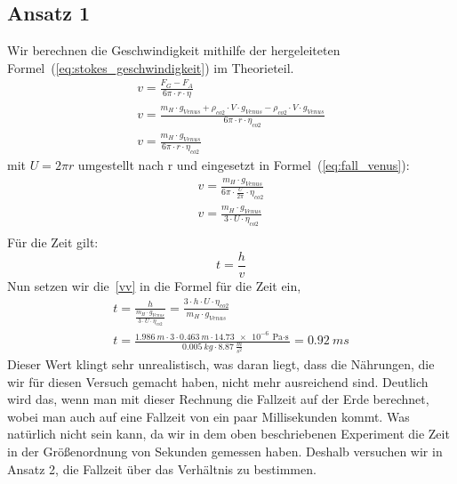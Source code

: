 \documentclass{article}
\begin{document}
      \subsection{Ansatz 1}
          Wir berechnen die Geschwindigkeit mithilfe der hergeleiteten Formel~(\ref{eq:stokes_geschwindigkeit}) im Theorieteil.
          \begin{equation}\label{eq:fall_venus}
              \begin{gathered}
                  v = \frac{ F_G - F_A }{ 6 \pi \cdot r \cdot \eta } \\
                  v= \frac{m_H \cdot g_{Venus}+\rho_{co2}\cdot V \cdot g_{Venus} - \rho_{co2}\cdot V \cdot g_{Venus}}{6 \pi \cdot r \cdot \eta_{co2}} \\
                  v= \frac{m_H \cdot g_{Venus}}{6 \pi \cdot r \cdot \eta_{co2}}
              \end{gathered}
          \end{equation}
          mit \( U = 2 \pi r \) umgestellt nach r und eingesetzt in Formel~(\ref{eq:fall_venus}):
          \begin{equation} \label{vv}
              \begin{gathered}
                  v = \frac{m_H \cdot g_{Venus}}{6 \pi \cdot \frac{U}{2\pi} \cdot \eta_{co2}} \\
                  v = \frac{m_H \cdot g_{Venus}}{3 \cdot U \cdot \eta_{co2}} \\
              \end{gathered}
          \end{equation}
          Für die Zeit gilt:
          \begin{equation}
              t= \frac{h}{v}
          \end{equation}
          Nun setzen wir die~\ref{vv} in die Formel für die Zeit ein,
          \begin{equation}
              \begin{gathered}
                  t = \frac{h}{\frac{m_H \cdot g_{Venus}}{3 \cdot U \cdot \eta_{co2}}} = \frac{3 \cdot h \cdot U \cdot \eta_{co2}}{m_H\cdot g_{Venus}} \\
                  t = \frac{ \SI{1,986}{m} \cdot 3 \cdot \SI{0,463}{m} \cdot \SI{14.73e-6}{\pascal\cdot\second}}{ \SI{0.005}{kg} \cdot \SI{8.87}{\frac{m}{s^2}} } = \SI{0.92}{ms}
              \end{gathered}
          \end{equation}
          Dieser Wert klingt sehr unrealistisch, was daran liegt, dass die Nährungen, die wir für diesen Versuch gemacht haben, nicht mehr ausreichend sind.
          Deutlich wird das, wenn man mit dieser Rechnung die Fallzeit auf der Erde berechnet, wobei man auch auf eine Fallzeit von ein paar Millisekunden kommt.
          Was natürlich nicht sein kann, da wir in dem oben beschriebenen Experiment die Zeit in der Größenordnung von Sekunden gemessen haben.
          Deshalb versuchen wir in Ansatz 2, die Fallzeit über das Verhältnis zu bestimmen.
\end{document}
